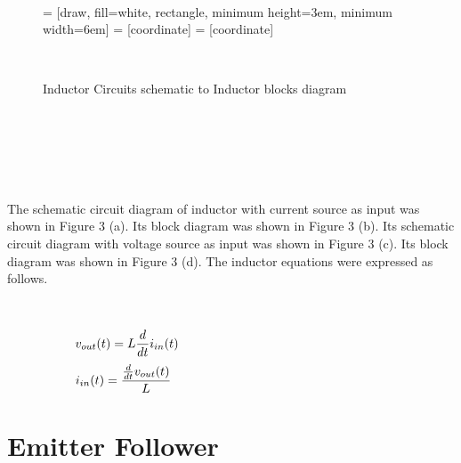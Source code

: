\documentclass[10pt,a4paper]{article}
\begin{document}
\begin{CJK*}{UTF8}{gbsn}
\begin{figure}[H]
 \par \ \par\noindent {} = [draw, fill=white, rectangle,                             
    minimum height=3em, minimum width=6em]                                     
 = [coordinate]                                              
 = [coordinate]                                             
 \par \ \par\noindent \caption{Inductor Circuits schematic to Inductor blocks diagram}
    \end{figure}

 \par \ \par\noindent \par \ \par
 \par \ \par\noindent The schematic circuit diagram of inductor with current source as input     was shown in Figure 3 (a). Its block diagram was shown in Figure 3 (b).     Its schematic circuit diagram with voltage source as input was shown in     Figure 3 (c). Its block diagram was shown in Figure 3 (d). The inductor     equations were expressed as follows.
 \par \ \par\begin{equation}
 \begin{minipage}{250pt}
                \begin{flushleft} $\displaystyle v_{out}{\left(t \right)} = L \frac{d}{d t} i_{in}{\left(t \right)}$  \end{flushleft}
 \end{minipage}
 \end{equation}
\begin{equation}
 \begin{minipage}{250pt}
                \begin{flushleft} $\displaystyle i_{in}{\left(t \right)} = \frac{\frac{d}{d t} v_{out}{\left(t \right)}}{L}$  \end{flushleft}
 \end{minipage}
 \end{equation}
\noindent \section{Emitter Follower}
 \par \ \par\noindent \begin{figure}[H] \centering 


\end{figure}
\end{CJK*}
\end{document}

